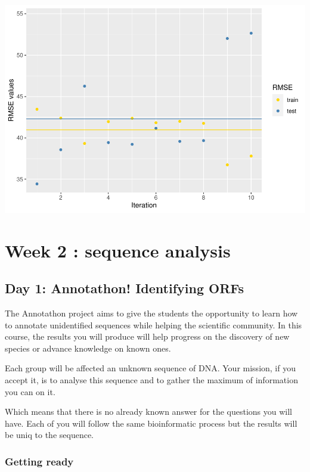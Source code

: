 \documentclass[
]{book}
\begin{document}
\includegraphics{_main_files/figure-latex/unnamed-chunk-165-1.pdf}

\hypertarget{week-2-sequence-analysis}{%
\chapter*{Week 2 : sequence analysis}\label{week-2-sequence-analysis}}

\hypertarget{day-1-annotathon-identifying-orfs}{%
\section{Day 1: Annotathon! Identifying ORFs}\label{day-1-annotathon-identifying-orfs}}

The Annotathon project aims to give the students the opportunity to learn how to annotate unidentified sequences while helping the scientific community. In this course, the results you will produce will help progress on the discovery of new species or advance knowledge on known ones.

Each group will be affected an unknown sequence of DNA. Your mission, if you accept it, is to analyse this sequence and to gather the maximum of information you can on it.

Which means that there is no already known answer for the questions you will have. Each of you will follow the same bioinformatic process but the results will be uniq to the sequence.

\hypertarget{getting-ready}{%
\subsection{Getting ready}\label{getting-ready}}
\end{document}
